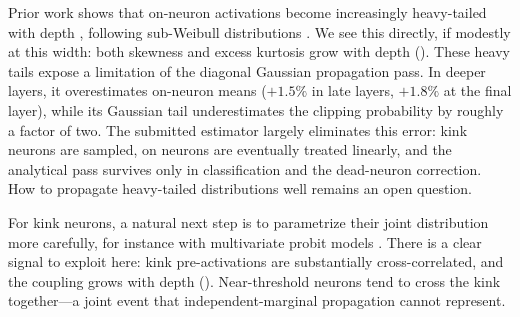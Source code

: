 Prior work shows that on-neuron activations become increasingly heavy-tailed with depth \citep{noci2021precise, zavatone2021exact}, following sub-Weibull distributions \citep{vladimirova2019understanding}. We see this directly, if modestly at this width: both skewness and excess kurtosis grow with depth (). These heavy tails expose a limitation of the diagonal Gaussian propagation pass. In deeper layers, it overestimates on-neuron means ($+1.5\%$ in late layers, $+1.8\%$ at the final layer), while its Gaussian tail underestimates the clipping probability by roughly a factor of two. The submitted estimator largely eliminates this error: kink neurons are sampled, on neurons are eventually treated linearly, and the analytical pass survives only in classification and the dead-neuron correction. How to propagate heavy-tailed distributions well remains an open question.

For kink neurons, a natural next step is to parametrize their joint distribution more carefully, for instance with multivariate probit models \citep{cragg1971some, chib2001metropolis}. There is a clear signal to exploit here: kink pre-activations are substantially cross-correlated, and the coupling grows with depth (). Near-threshold neurons tend to cross the kink together---a joint event that independent-marginal propagation cannot represent.